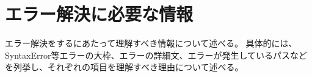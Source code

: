 \documentclass[main]{subfiles}
\begin{document}
\chapter{エラー解決に必要な情報}
エラー解決をするにあたって理解すべき情報について述べる。 具体的には、SyntaxError等エラーの大枠、エラーの詳細文、エラーが発生しているパスなどを列挙し、それぞれの項目を理解すべき理由について述べる。
\end{document}
